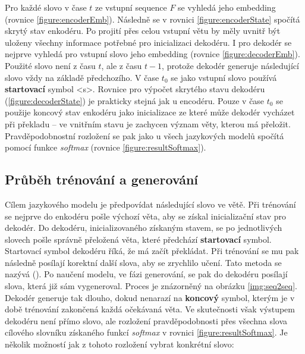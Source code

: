 Pro každé slovo v čase $t$ ze vstupní sequence $F$ se vyhledá jeho embedding (rovnice \ref{figure:encoderEmb}). Následně se v rovnici \ref{figure:encoderState} spočítá skrytý stav enkodéru. Po projití přes celou vstupní větu by měly uvnitř být uloženy všechny informace potřebné pro inicializaci dekodéru. I pro dekodér se nejprve vyhledá pro vstupní slovo jeho embedding (rovnice \ref{figure:decoderEmb}). Použité slovo není z času $t$, ale z času $t-1$, protože dekodér generuje následující slovo vždy na základě předchozího. V čase $t_0$ se jako vstupní slovo používá \textbf{startovací} symbol <s>. Rovnice pro výpočet skrytého stavu dekodéru (\ref{figure:decoderState}) je prakticky stejná jak u encodéru. Pouze v čase $t_0$ se použije koncový stav enkodéru jako inicializace ze které může dekodér vycházet při překladu -- ve vnitřním stavu je zachycen význam věty, kterou má přeložit. Pravděpodobnostní rozložení se pak jako u všech jazykových modelů spočítá pomocí funkce \emph{softmax} (rovnice \ref{figure:resultSoftmax}).


\subsection{Průběh trénování a generování}

Cílem jazykového modelu je předpovídat následující slovo ve větě. Při trénování se nejprve do enkodéru pošle výchozí věta, aby se získal inicializační stav pro dekodér. Do dekodéru, inicializovaného získaným stavem, se po jednotlivých slovech pošle správně přeložená věta, které předchází \textbf{startovací} symbol. Startovací symbol dekodéru říká, že má začít překládat. Při trénování se mu pak následně posílají korektní další slova, aby se zrychlilo učení. Tato metoda se nazývá \label{teacherForcing} (\cite{teacherForcing}). Po naučení modelu, ve fázi generování, se pak do dekodéru posílají slova, která již sám vygeneroval. Proces je znázorněný na obrázku \ref{img:seq2seq}. Dekodér generuje tak dlouho, dokud nenarazí na \textbf{koncový} symbol, kterým je v době trénování zakončená každá očekávaná věta. Ve skutečnosti však výstupem dekodéru není přímo slovo, ale rozložení pravděpodobnosti přes všechna slova cílového slovníku získaného funkcí \emph{softmax} v rovnici \ref{figure:resultSoftmax}. Je několik možností jak z tohoto rozložení vybrat konkrétní slovo:

